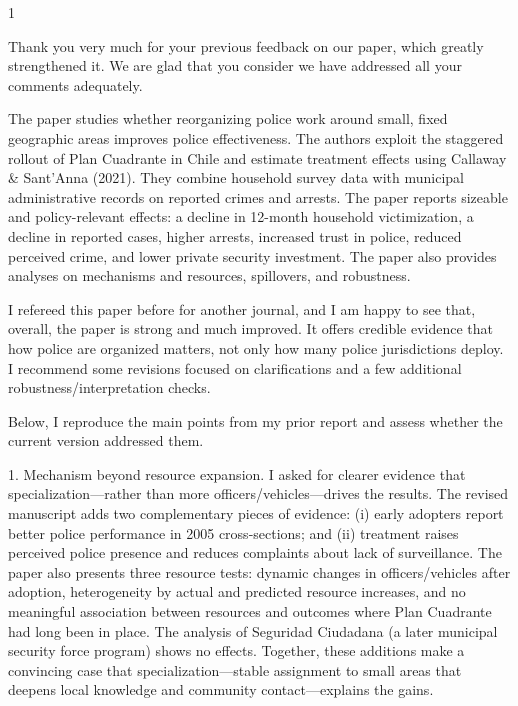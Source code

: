 
\begin{spacing}{1}
\justifying \color{darkdarkgray} \noindent

Thank you very much for your previous feedback on our paper, which greatly strengthened it. We are glad that you consider we have addressed all your comments adequately.



\end{spacing}


\begin{refcomment}

The paper studies whether reorganizing police work around small, fixed geographic areas improves police effectiveness. The authors exploit the staggered rollout of Plan Cuadrante in Chile and estimate treatment effects using Callaway \& Sant’Anna (2021). They combine household survey data with municipal administrative records on reported crimes and arrests. The paper reports sizeable and policy-relevant effects: a decline in 12-month household victimization, a decline in reported cases, higher arrests, increased trust in police, reduced perceived crime, and lower private security investment. The paper also provides analyses on mechanisms and resources, spillovers, and robustness.

I refereed this paper before for another journal, and I am happy to see that, overall, the paper is strong and much improved. It offers credible evidence that how police are organized matters, not only how many police jurisdictions deploy. I recommend some revisions focused on clarifications and a few additional robustness/interpretation checks.

Below, I reproduce the main points from my prior report and assess whether the current version addressed them.

1.	Mechanism beyond resource expansion. I asked for clearer evidence that specialization—rather than more officers/vehicles—drives the results. The revised manuscript adds two complementary pieces of evidence: (i) early adopters report better police performance in 2005 cross-sections; and (ii) treatment raises perceived police presence and reduces complaints about lack of surveillance. The paper also presents three resource tests: dynamic changes in officers/vehicles after adoption, heterogeneity by actual and predicted resource increases, and no meaningful association between resources and outcomes where Plan Cuadrante had long been in place. The analysis of Seguridad Ciudadana (a later municipal security force program) shows no effects. Together, these additions make a convincing case that specialization—stable assignment to small areas that deepens local knowledge and community contact—explains the gains.


\end{refcomment}
